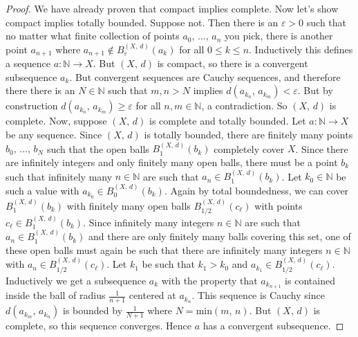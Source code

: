 \documentclass{article}
\theoremstyle{plain}
\theoremstyle{normal}
\begin{document}
        \begin{proof}
            We have already proven that compact implies complete. Now let's
            show compact implies totally bounded. Suppose not. Then there is
            an $\varepsilon>0$ such that no matter what finite collection of
            points $a_{0},\,\dots,\,a_{n}$ you pick, there is another point
            $a_{n+1}$ where $a_{n+1}\notin{B}_{\varepsilon}^{(X,\,d)}(a_{k})$
            for all $0\leq{k}\leq{n}$. Inductively this defines a sequence
            $a:\mathbb{N}\rightarrow{X}$. But $(X,\,d)$ is compact, so there
            is a convergent subsequence $a_{k}$. But convergent sequences are
            Cauchy sequences, and therefore there there is an
            $N\in\mathbb{N}$ such that $m,n>N$ implies
            $d(a_{k_{n}},\,a_{k_{m}})<\varepsilon$. But by construction
            $d(a_{k_{n}},\,a_{k_{m}})\geq\varepsilon$ for all
            $n,m\in\mathbb{N}$, a contradiction. So $(X,\,d)$ is complete.
            Now, suppose $(X,\,d)$ is complete and totally bounded. Let
            $a:\mathbb{N}\rightarrow{X}$ be any sequence. Since
            $(X,\,d)$ is totally bounded, there are finitely many points
            $b_{0},\,\dots,\,b_{N}$ such that the open balls
            $B_{1}^{(X,\,d)}(b_{k})$ completely cover $X$. Since there are
            infinitely integers and only finitely many open balls, there
            must be a point $b_{k}$ such that infinitely many $n\in\mathbb{N}$
            are such that $a_{n}\in{B}_{1}^{(X,\,d)}(b_{k})$. Let
            $k_{0}\in\mathbb{N}$ be such a value
            with $a_{k_{0}}\in{B}_{0}^{(X,\,d)}(b_{k})$. Again by total
            boundedness, we can cover $B_{1}^{(X,\,d)}(b_{k})$ with finitely
            many open balls $B_{1/2}^{(X,\,d)}(c_{\ell})$ with points
            $c_{\ell}\in{B}_{1}^{(X,\,d)}(b_{k})$. Since infinitely many integers
            $n\in\mathbb{N}$ are such that $a_{n}\in{B}_{1}^{(X,\,d)}(b_{k})$
            and there are only finitely many balls covering this set,
            one of these open balls must again be such that there are
            infinitely many integers $n\in\mathbb{N}$ with
            $a_{n}\in{B}_{1/2}^{(X,\,d)}(c_{\ell})$. Let
            $k_{1}$ be such that $k_{1}>k_{0}$ and
            $a_{k_{1}}\in{B}_{1/2}^{(X,\,d)}(c_{\ell})$. Inductively
            we get a subsequence $a_{k}$ with the property that
            $a_{k_{n+1}}$ is contained inside the ball of radius
            $\frac{1}{n+1}$ centered at $a_{k_{n}}$. This sequence is
            Cauchy since $d(a_{k_{m}},\,a_{k_{n}})$ is bounded by
            $\frac{1}{N+1}$ where $N=\textrm{min}(m,\,n)$. But $(X,\,d)$ is
            complete, so this sequence
            converges. Hence $a$ has a convergent subsequence.
        \end{proof}
\end{document}
